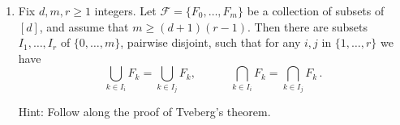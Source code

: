 \documentclass[kulak]{tplt}
\theoremstyle{definition}
\newcommand{\FF}{\mathcal F}
\begin{document}
\begin{enumerate}
\item 
Fix $d, m, r\geq 1$ integers.
Let $\FF = \{ F_0, \ldots, F_m\}$ be a collection of subsets of $[d]$, and assume that $m \geq (d+1)(r-1)$.
Then there are subsets $I_1, \ldots , I_r$ of $\{0, \ldots, m\}$, pairwise disjoint, such that for any $i, j$ in $\{1, \ldots, r \}$ we have
$$ \bigcup_{k \in I_i} F_k = \bigcup_{k \in I_j} F_k , \quad \quad \quad \bigcap_{k \in I_i} F_k = \bigcap_{k \in I_j} F_k \, .$$

Hint: Follow along the proof of Tveberg's theorem.

\end{enumerate}
\end{document}
